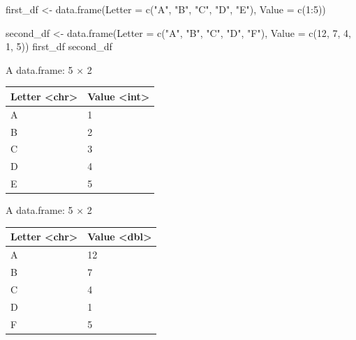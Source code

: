 \documentclass[
  letterpaper,
  DIV=11,
  numbers=noendperiod]{scrreprt}
\newenvironment{Shaded}{\begin{snugshade}}{\end{snugshade}}
\newcommand{\AttributeTok}[1]{\textcolor[rgb]{0.40,0.45,0.13}{#1}}
\newcommand{\DecValTok}[1]{\textcolor[rgb]{0.68,0.00,0.00}{#1}}
\newcommand{\FunctionTok}[1]{\textcolor[rgb]{0.28,0.35,0.67}{#1}}
\newcommand{\NormalTok}[1]{\textcolor[rgb]{0.00,0.23,0.31}{#1}}
\newcommand{\OtherTok}[1]{\textcolor[rgb]{0.00,0.23,0.31}{#1}}
\newcommand{\SpecialCharTok}[1]{\textcolor[rgb]{0.37,0.37,0.37}{#1}}
\newcommand{\StringTok}[1]{\textcolor[rgb]{0.13,0.47,0.30}{#1}}
\begin{document}
\begin{Shaded}
\begin{Highlighting}[]
\NormalTok{first\_df }\OtherTok{\textless{}{-}} \FunctionTok{data.frame}\NormalTok{(}\AttributeTok{Letter =} \FunctionTok{c}\NormalTok{(}\StringTok{"A"}\NormalTok{, }\StringTok{"B"}\NormalTok{, }\StringTok{"C"}\NormalTok{, }\StringTok{"D"}\NormalTok{, }\StringTok{"E"}\NormalTok{),}
                      \AttributeTok{Value =} \FunctionTok{c}\NormalTok{(}\DecValTok{1}\SpecialCharTok{:}\DecValTok{5}\NormalTok{))}

\NormalTok{second\_df }\OtherTok{\textless{}{-}} \FunctionTok{data.frame}\NormalTok{(}\AttributeTok{Letter =} \FunctionTok{c}\NormalTok{(}\StringTok{"A"}\NormalTok{, }\StringTok{"B"}\NormalTok{, }\StringTok{"C"}\NormalTok{, }\StringTok{"D"}\NormalTok{, }\StringTok{"F"}\NormalTok{),}
                      \AttributeTok{Value =} \FunctionTok{c}\NormalTok{(}\DecValTok{12}\NormalTok{, }\DecValTok{7}\NormalTok{, }\DecValTok{4}\NormalTok{, }\DecValTok{1}\NormalTok{, }\DecValTok{5}\NormalTok{))}
\NormalTok{first\_df}
\NormalTok{second\_df }
\end{Highlighting}
\end{Shaded}

A data.frame: 5 × 2

\begin{longtable}[]{@{}ll@{}}
\toprule\noalign{}
Letter \textless chr\textgreater{} & Value
\textless int\textgreater{} \\
\midrule\noalign{}
\endhead
\bottomrule\noalign{}
\endlastfoot
A & 1 \\
B & 2 \\
C & 3 \\
D & 4 \\
E & 5 \\
\end{longtable}

A data.frame: 5 × 2

\begin{longtable}[]{@{}ll@{}}
\toprule\noalign{}
Letter \textless chr\textgreater{} & Value
\textless dbl\textgreater{} \\
\midrule\noalign{}
\endhead
\bottomrule\noalign{}
\endlastfoot
A & 12 \\
B & 7 \\
C & 4 \\
D & 1 \\
F & 5 \\
\end{longtable}
\end{document}
